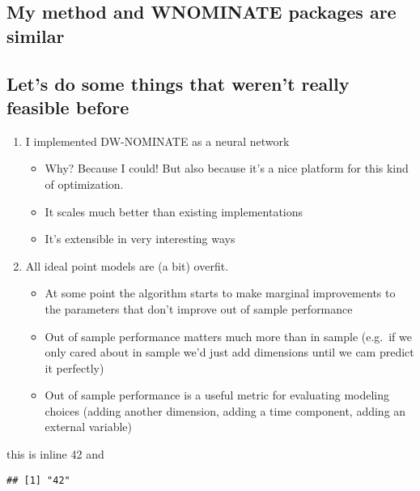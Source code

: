 \documentclass[11pt,]{article}
\newenvironment{Shaded}{\begin{snugshade}}{\end{snugshade}}
\newcommand{\OperatorTok}[1]{\textcolor[rgb]{0.81,0.36,0.00}{\textbf{#1}}}
\newcommand{\NormalTok}[1]{#1}
\providecommand{\tightlist}{%
\setlength{\itemsep}{0pt}\setlength{\parskip}{0pt}}
\begin{document}
\subsection{My method and WNOMINATE packages are
similar}\label{my-method-and-wnominate-packages-are-similar}

\subsection{Let's do some things that weren't really feasible
before}\label{lets-do-some-things-that-werent-really-feasible-before}

\begin{enumerate}
\def\labelenumi{\arabic{enumi}.}
\tightlist
\item
  I implemented DW-NOMINATE as a neural network

  \begin{itemize}
  \tightlist
  \item
    Why? Because I could! But also because it's a nice platform for this
    kind of optimization.
  \item
    It scales much better than existing implementations
  \item
    It's extensible in very interesting ways
  \end{itemize}
\item
  All ideal point models are (a bit) overfit.

  \begin{itemize}
  \tightlist
  \item
    At some point the algorithm starts to make marginal improvements to
    the parameters that don't improve out of sample performance
  \item
    Out of sample performance matters much more than in sample (e.g.~if
    we only cared about in sample we'd just add dimensions until we cam
    predict it perfectly)
  \item
    Out of sample performance is a useful metric for evaluating modeling
    choices (adding another dimension, adding a time component, adding
    an external variable)
  \end{itemize}
\end{enumerate}

this is inline 42 and

\begin{Shaded}
\end{Shaded}

\begin{verbatim}
## [1] "42"
\end{verbatim}




\newpage
\singlespacing 
\end{document}
